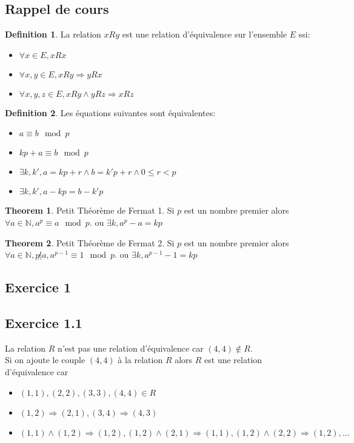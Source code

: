 \documentclass[]{book}
\theoremstyle{definition}
\newtheorem{defn}{Definition}
\newtheorem{thm}{Theorem}
\newcommand{\bb}[1]{\mathbb{#1}}
\newcommand{\N}{\bb{N}}
\begin{document}
\subsection*{Rappel de cours}

\begin{defn}
La relation $xRy$ est une relation d'\'equivalence sur l'ensemble $E$ ssi:
\begin{itemize}
\item $\forall x \in E, xRx$
\item $\forall x,y \in E, xRy \Rightarrow yRx$
\item $\forall x,y,z \in E, xRy \wedge yRz \Rightarrow xRz$
\end{itemize}
\end{defn}


\begin{defn}
Les \'equations suivantes sont \'equivalentes:
\begin{itemize}
\item $a \equiv b \mod p$
\item $kp+a \equiv b \mod p$
\item $\exists k,k', a = kp + r \land b = k'p +r \land 0 \leq r < p$
\item $\exists k,k', a - kp = b - k'p$

\end{itemize}
\end{defn}

\begin{thm}
Petit Th\'eor\`eme de Fermat 1. Si $p$ est un nombre premier alors $\forall a \in \N, a^p \equiv a \mod p$. ou $\exists k, a^p-a = kp$
\end{thm}

\begin{thm}
Petit Th\'eor\`eme de Fermat 2. Si $p$ est un nombre premier alors $\forall a \in \N, p \not | a, a^{p-1} \equiv 1 \mod p$. ou $\exists k, a^{p-1}-1 = kp$
\end{thm}


\newpage
\subsection*{Exercice 1}
\subsection*{Exercice 1.1}
La relation $R$ n'est pas une relation d'\'equivalence car $(4,4) \not\in R$.\\
Si on ajoute le couple $(4,4)$ \`a la relation $R$ alors $R$ est une relation d'\'equivalence car 
\begin{itemize}
\item $(1,1),(2,2),(3,3),(4,4) \in R$
\item $(1,2) \Rightarrow (2,1), (3,4) \Rightarrow (4,3)$
\item $(1,1) \wedge (1,2) \Rightarrow (1,2), (1,2) \wedge (2,1) \Rightarrow (1,1), (1,2) \wedge (2,2) \Rightarrow (1,2),\ldots $
\end{itemize}
\end{document}
